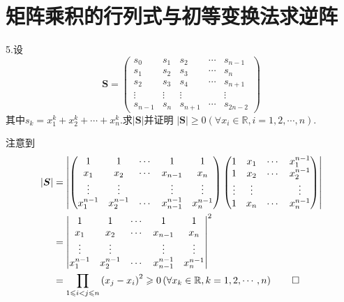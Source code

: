 \section{矩阵乘积的行列式与初等变换法求逆阵}
5.设\[
\bm{S}=\begin{pmatrix}
	s_0&s_1&s_2&\cdots&s_{n-1}\\
	s_1&s_2&s_3&\cdots&s_n\\
	s_2&s_3&s_4&\cdots&s_{n+1}\\
	\vdots&\vdots&\vdots&&\vdots\\
	s_{n-1}&s_n&s_{n+1}&\cdots&s_{2n-2}
\end{pmatrix}
\]
其中$s_k=x_1^k+x_2^k+\cdots+x_n^k.$求$\left|\bm{S}\right|$并证明
$\left|\bm{S}\right|\geqslant 0\left(\forall x_i\in\mathbb{R},i=1,2,\cdots,n\right)$.
\begin{Proof}
注意到
\begin{align*}
	\left|\bm{S}\right|&=\begin{vmatrix}
		\begin{pmatrix}
			1&1&\cdots&1&1\\
			x_1&x_2&\cdots&x_{n-1}&x_n\\
			\vdots&\vdots&&\vdots&\vdots\\
			x_1^{n-1}&x_2^{n-1}&\cdots&x_{n-1}^{n-1}&x_n^{n-1}
		\end{pmatrix}
		\begin{pmatrix}
			1&x_1&\cdots&x_1^{n-1}\\
			1&x_2&\cdots&x_2^{n-1}\\
			\vdots&\vdots&&\vdots\\
			1&x_n&\cdots&x_n^{n-1}
		\end{pmatrix}
	\end{vmatrix}\\
	&=\begin{vmatrix}
		1&1&\cdots&1&1\\
			x_1&x_2&\cdots&x_{n-1}&x_n\\
			\vdots&\vdots&&\vdots&\vdots\\
			x_1^{n-1}&x_2^{n-1}&\cdots&x_{n-1}^{n-1}&x_n^{n-1}
	\end{vmatrix}^2\\
	&=\prod_{1\leqslant i<j\leqslant n}
	\left(x_j-x_i\right)^2\geqslant 0\left(\forall x_k\in\mathbb{R},k=1,2,\cdots,
	n\right)\qedhere
\end{align*}
\end{Proof}

